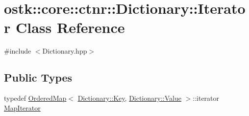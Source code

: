 \hypertarget{classostk_1_1core_1_1ctnr_1_1_dictionary_1_1_iterator}{}\section{ostk\+:\+:core\+:\+:ctnr\+:\+:Dictionary\+:\+:Iterator Class Reference}
\label{classostk_1_1core_1_1ctnr_1_1_dictionary_1_1_iterator}


{\ttfamily \#include $<$Dictionary.\+hpp$>$}

\subsection*{Public Types}
\begin{DoxyCompactItemize}
\item 
typedef \hyperlink{namespaceostk_1_1core_1_1ctnr_a13ac23065e75eb425f38bfca4d0c6b38}{Ordered\+Map}$<$ \hyperlink{classostk_1_1core_1_1ctnr_1_1_dictionary_aa3b171525039535f342d271d27f90407}{Dictionary\+::\+Key}, \hyperlink{classostk_1_1core_1_1ctnr_1_1_dictionary_ace6ab82268031e972455affca8730c9c}{Dictionary\+::\+Value} $>$\+::iterator \hyperlink{classostk_1_1core_1_1ctnr_1_1_dictionary_1_1_iterator_a0d5a95dd4a931ded2d8d156da4499348}{Map\+Iterator}
\end{DoxyCompactItemize}
